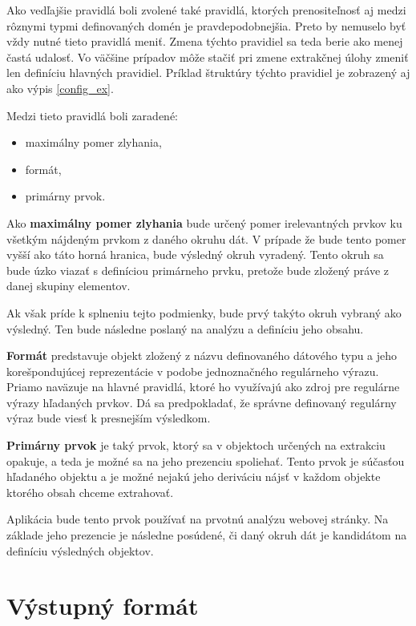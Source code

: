 Ako vedľajšie pravidlá boli zvolené také pravidlá, ktorých prenositeľnosť aj medzi rôznymi typmi definovaných domén je pravdepodobnejšia. Preto by nemuselo byť vždy nutné tieto pravidlá meniť. Zmena týchto pravidiel sa teda berie ako menej častá udalosť. Vo väčšine prípadov môže stačiť pri zmene extrakčnej úlohy zmeniť len definíciu hlavných pravidiel. Príklad štruktúry týchto pravidiel je zobrazený aj ako výpis \ref{config_ex}.

Medzi tieto pravidlá boli zaradené:
\begin{itemize}
    \item maximálny pomer zlyhania,
    \item formát,
    \item primárny prvok.
\end{itemize}

\bigskip

Ako \textbf{maximálny pomer zlyhania} bude určený pomer irelevantných prvkov ku všetkým nájdeným prvkom z daného okruhu dát. V prípade že bude tento pomer vyšší ako táto horná hranica, bude výsledný okruh vyradený. Tento okruh sa bude úzko viazať s definíciou primárneho prvku, pretože bude zložený práve z danej skupiny elementov. 

Ak však príde k splneniu tejto podmienky, bude prvý takýto okruh vybraný ako výsledný. Ten bude následne poslaný na analýzu a definíciu jeho obsahu. 

\bigskip

\textbf{Formát} predstavuje objekt zložený z názvu definovaného dátového typu a jeho korešpondujúcej reprezentácie v podobe jednoznačného regulárneho výrazu. Priamo naväzuje na hlavné pravidlá, ktoré ho využívajú ako zdroj pre regulárne výrazy hľadaných prvkov. Dá sa predpokladať, že správne definovaný regulárny výraz bude viesť k presnejším výsledkom. 

\bigskip

\textbf{Primárny prvok} je taký prvok, ktorý sa v objektoch určených na extrakciu opakuje, a teda je možné sa na jeho prezenciu spoliehať. Tento prvok je súčasťou hľadaného objektu a je možné nejakú jeho deriváciu nájsť v každom objekte ktorého obsah chceme extrahovať. 

Aplikácia bude tento prvok používať na prvotnú analýzu webovej stránky. Na základe jeho prezencie je následne posúdené, či daný okruh dát je kandidátom na definíciu výsledných objektov.

\newpage

\section{Výstupný formát}

